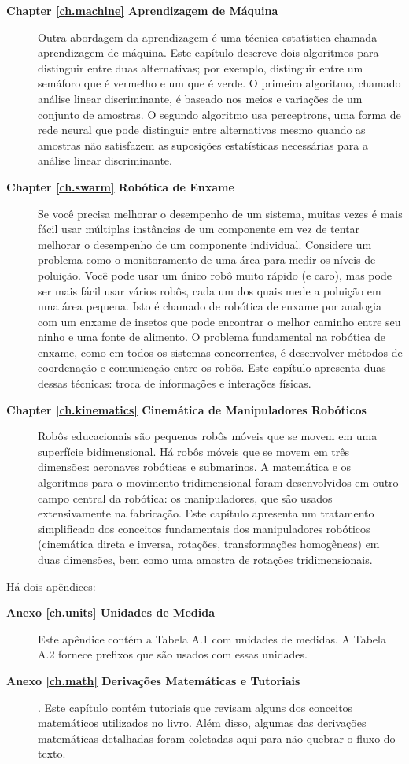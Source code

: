 \begin{description}
\item [\textbf{Chapter \ref{ch.machine} Aprendizagem de Máquina}] Outra abordagem da aprendizagem é uma técnica estatística chamada aprendizagem de máquina. Este capítulo descreve dois algoritmos para distinguir entre duas alternativas; por exemplo, distinguir entre um semáforo que é vermelho e um que é verde. O primeiro algoritmo, chamado análise linear discriminante, é baseado nos meios e variações de um conjunto de amostras. O segundo algoritmo usa perceptrons, uma forma de rede neural que pode distinguir entre alternativas mesmo quando as amostras não satisfazem as suposições estatísticas necessárias para a análise linear discriminante.

\item [\textbf{Chapter \ref{ch.swarm} Robótica de Enxame}] Se você precisa melhorar o desempenho de um sistema, muitas vezes é mais fácil usar múltiplas instâncias de um componente em vez de tentar melhorar o desempenho de um componente individual. Considere um problema como o monitoramento de uma área para medir os níveis de poluição. Você pode usar um único robô muito rápido (e caro), mas pode ser mais fácil usar vários robôs, cada um dos quais mede a poluição em uma área pequena. Isto é chamado de robótica de enxame por analogia com um enxame de insetos que pode encontrar o melhor caminho entre seu ninho e uma fonte de alimento. O problema fundamental na robótica de enxame, como em todos os sistemas concorrentes, é desenvolver métodos de coordenação e comunicação entre os robôs. Este capítulo apresenta duas dessas técnicas: troca de informações e interações físicas.

\item [\textbf{Chapter \ref{ch.kinematics} Cinemática de Manipuladores Robóticos}] Robôs educacionais são pequenos robôs móveis que se movem em uma superfície bidimensional. Há robôs móveis que se movem em três dimensões: aeronaves robóticas e submarinos. A matemática e os algoritmos para o movimento tridimensional foram desenvolvidos em outro campo central da robótica: os manipuladores, que são usados extensivamente na fabricação. Este capítulo apresenta um tratamento simplificado dos conceitos fundamentais dos manipuladores robóticos (cinemática direta e inversa, rotações, transformações homogêneas) em duas dimensões, bem como uma amostra de rotações tridimensionais.
\end{description}

Há dois apêndices:
\begin{description}
\item [\textbf{Anexo \ref{ch.units} Unidades de Medida}] Este apêndice contém a Tabela A.1 com unidades de medidas. A Tabela A.2 fornece prefixos que são usados com essas unidades.

\item [\textbf{Anexo \ref{ch.math} Derivações Matemáticas e Tutoriais}]. Este capítulo contém tutoriais que revisam alguns dos conceitos matemáticos utilizados no livro. Além disso, algumas das derivações matemáticas detalhadas foram coletadas aqui para não quebrar o fluxo do texto.
\end{description}


